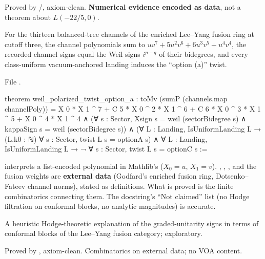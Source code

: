 \begin{status}
Proved by /, axiom-clean. \textbf{Numerical evidence encoded as data}, not a
theorem about $L(-22/5,0)$.
\end{status}

\begin{theorem}\label{l19:thm:weil}
For the thirteen balanced-tree channels of the enriched Lee--Yang fusion ring at cutoff three, the channel
polynomials sum to $uv^7+5u^2v^6+6u^3v^5+u^4v^4$, the recorded channel signs equal the Weil signs
$i^{p-q}$ of their bidegrees, and every class-uniform vacuum-anchored landing induces the ``option (a)''
twist.
\end{theorem}

\noindent File .
\begin{leancode}
theorem weil_polarized_twist_option_a :
    toMv (sumP (channels.map channelPoly))
        = X 0 * X 1 ^ 7 + C 5 * X 0 ^ 2 * X 1 ^ 6 + C 6 * X 0 ^ 3 * X 1 ^ 5
            + X 0 ^ 4 * X 1 ^ 4
      ∧ (∀ s : Sector,
          Xsign s = weil (sectorBidegree s) ∧ kappaSign s = weil (sectorBidegree s))
      ∧ (∀ L : Landing, IsUniformLanding L → (L.k0 : ℕ) %
          ∀ s : Sector, twist L s = optionA s)
      ∧ ∀ L : Landing, IsUniformLanding L → ¬ ∀ s : Sector, twist L s = optionC s :=
\end{leancode}

\begin{dictionary}
 interprets a list-encoded polynomial in Mathlib's  ($X_0 = u$,
$X_1 = v$). , , ,  and the fusion weights  are
\textbf{external data} (Godfard's enriched fusion ring, Dotsenko--Fateev channel norms), stated as
definitions. What is proved is the finite combinatorics connecting them. The docstring's ``Not claimed''
list (no Hodge filtration on conformal blocks, no analytic magnitudes) is accurate.
\end{dictionary}

\begin{physics}
A heuristic Hodge-theoretic explanation of the graded-unitarity signs in terms of conformal blocks of the
Lee--Yang fusion category; exploratory.
\end{physics}

\begin{status}
Proved by , axiom-clean. Combinatorics on external data; no VOA content.
\end{status}

